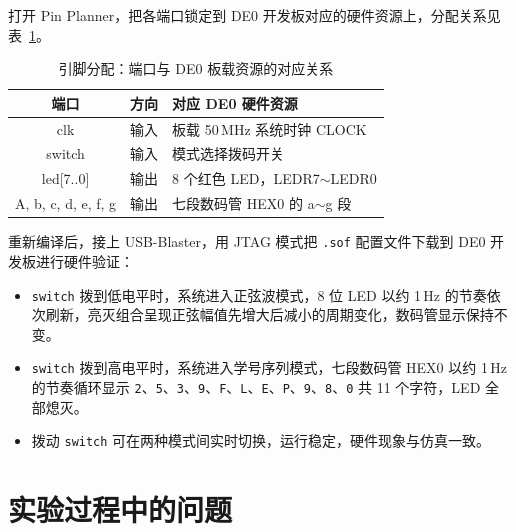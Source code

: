 \documentclass[12pt]{ctexart}
\begin{document}
打开 Pin Planner，把各端口锁定到 DE0 开发板对应的硬件资源上，分配关系见表~\ref{tab:pins}。

\begin{table}[H]
    \centering
    \caption{引脚分配：端口与 DE0 板载资源的对应关系}
    \label{tab:pins}
    \begin{tabular}{ccl}
        \toprule
        \textbf{端口} & \textbf{方向} & \textbf{对应 DE0 硬件资源} \\
        \midrule
        clk               & 输入 & 板载 50\,MHz 系统时钟 CLOCK \\
        switch            & 输入 & 模式选择拨码开关 \\
        led[7..0]         & 输出 & 8 个红色 LED，LEDR7$\sim$LEDR0 \\
        A, b, c, d, e, f, g & 输出 & 七段数码管 HEX0 的 a$\sim$g 段 \\
        \bottomrule
    \end{tabular}
\end{table}

重新编译后，接上 USB-Blaster，用 JTAG 模式把 \texttt{.sof} 配置文件下载到 DE0 开发板进行硬件验证：

\begin{itemize}
    \item \texttt{switch} 拨到低电平时，系统进入正弦波模式，8 位 LED 以约 1\,Hz 的节奏依次刷新，亮灭组合呈现正弦幅值先增大后减小的周期变化，数码管显示保持不变。
    \item \texttt{switch} 拨到高电平时，系统进入学号序列模式，七段数码管 HEX0 以约 1\,Hz 的节奏循环显示 \texttt{2}、\texttt{5}、\texttt{3}、\texttt{9}、\texttt{F}、\texttt{L}、\texttt{E}、\texttt{P}、\texttt{9}、\texttt{8}、\texttt{0} 共 11 个字符，LED 全部熄灭。
    \item 拨动 \texttt{switch} 可在两种模式间实时切换，运行稳定，硬件现象与仿真一致。
\end{itemize}

\section{实验过程中的问题}
\end{document}
